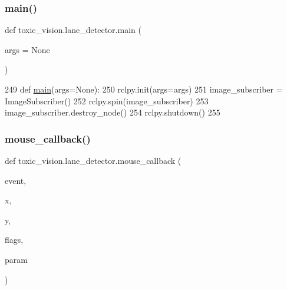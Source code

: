 \subsubsection{\texorpdfstring{main()}{main()}}
{\footnotesize\ttfamily def toxic\+\_\+vision.\+lane\+\_\+detector.\+main (\begin{DoxyParamCaption}\item[{}]{args = {\ttfamily None} }\end{DoxyParamCaption})}


\begin{DoxyCode}
249 \textcolor{keyword}{def }\mbox{\hyperlink{namespacetoxic__vision_1_1lane__detector_a7a56502e886845d86ce39e37d087b5a8}{main}}(args=None):
250   rclpy.init(args=args)
251   image\_subscriber = ImageSubscriber()
252   rclpy.spin(image\_subscriber)
253   image\_subscriber.destroy\_node()
254   rclpy.shutdown()
255   
\end{DoxyCode}
\mbox{\label{namespacetoxic__vision_1_1lane__detector_a365ec8dd4fef50dc9623183b3e39e22d}} 
\subsubsection{\texorpdfstring{mouse\+\_\+callback()}{mouse\_callback()}}
{\footnotesize\ttfamily def toxic\+\_\+vision.\+lane\+\_\+detector.\+mouse\+\_\+callback (\begin{DoxyParamCaption}\item[{}]{event,  }\item[{}]{x,  }\item[{}]{y,  }\item[{}]{flags,  }\item[{}]{param }\end{DoxyParamCaption})}


